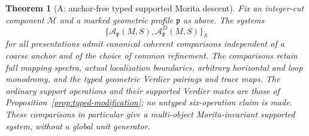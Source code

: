 \documentclass[11pt]{article}
\newtheorem{theorem}{Theorem}[section]
\theoremstyle{definition}
\theoremstyle{remark}
\begin{document}
\begin{theorem}[A: anchor-free typed supported Morita descent]
\label{thm:profile-descent}
Fix an integer-cut component $\mathscr M$ and a marked geometric
profile $\mathfrak p$ as above.  The systems
\[
 \bigl\{\mathcal A_{\mathfrak p}(M,S),
          \mathcal A_{\mathfrak p}^D(M,S)\bigr\}_S
\]
for all presentations admit canonical coherent comparisons independent
of a coarse anchor and of the choice of common refinement.  The
comparisons retain full mapping spectra, actual localization
boundaries, arbitrary horizontal and loop monodromy, and the typed
geometric Verdier pairings and trace maps.  The ordinary support
operations and their supported Verdier mates are those of
Proposition~\ref{prop:typed-modification}; no untyped six-operation
claim is made.  These comparisons in particular give a multi-object
Morita-invariant supported system, without a global unit generator.
\end{theorem}
\end{document}
